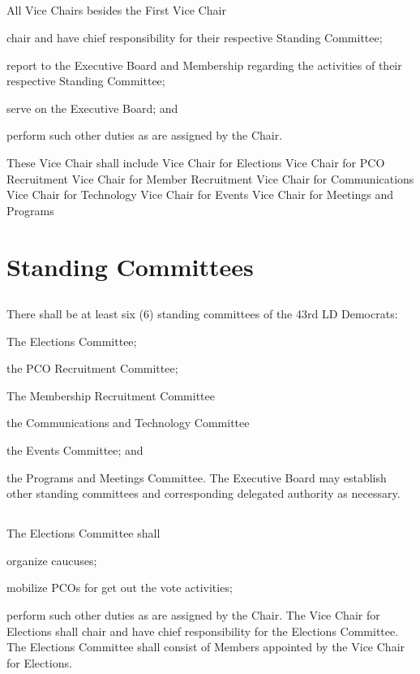 \documentclass{article}
\begin{document}
\subsection{}
All Vice Chairs besides the First Vice Chair
\begin{inlinealphalist}
    \item chair and have chief responsibility for their respective Standing Committee;
    \item report to the Executive Board and Membership regarding the activities of their respective Standing Committee;
    \item serve on the Executive Board; and
    \item perform such other duties as are assigned by the Chair.
\end{inlinealphalist}

These Vice Chair shall include
Vice Chair for Elections
Vice Chair for PCO Recruitment
Vice Chair for Member Recruitment
Vice Chair for Communications
Vice Chair for Technology
Vice Chair for Events
Vice Chair for Meetings and Programs

\section{Standing Committees}
\subsection{}
There shall be at least six (6) standing committees of the 43rd LD Democrats:
\begin{inlinealphalist}
    \item The Elections Committee;
    \item the PCO Recruitment Committee;
    \item The Membership Recruitment Committee
    \item the Communications and Technology Committee
    \item the Events Committee; and
    \item the Programs and Meetings Committee. The Executive Board may establish other standing committees and corresponding delegated authority as necessary.
\end{inlinealphalist}

\subsection{}
The Elections Committee shall
\begin{inlinealphalist}
    \item organize caucuses;
    \item mobilize PCOs for get out the vote activities;
    \item perform such other duties as are assigned by the Chair. The Vice Chair for Elections shall chair and have chief responsibility for the Elections Committee. The Elections Committee shall consist of Members appointed by the Vice Chair for Elections.
\end{inlinealphalist}
\end{document}
